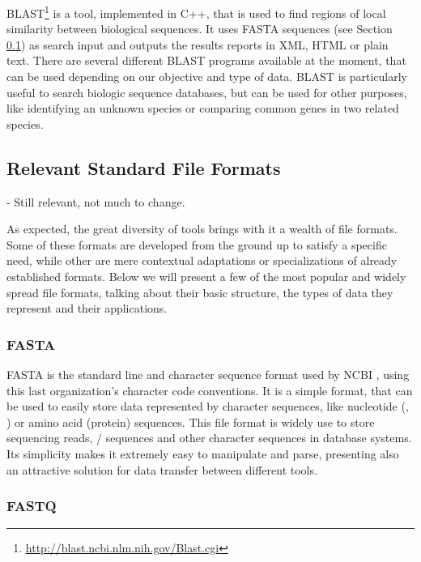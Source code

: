BLAST\footnote{\url{http://blast.ncbi.nlm.nih.gov/Blast.cgi}} is a tool,
implemented in C++, that is used to find regions of local similarity between
biological sequences. It uses FASTA sequences (see Section \ref{sec:formats}) as
search input and outputs the results reports in XML, HTML or plain text. There
are several different BLAST programs available at the moment, that can be used
depending on our objective and type of data. BLAST is particularly useful to
search biologic sequence databases, but can be used for other purposes, like
identifying an unknown species or comparing common genes in two related
species.

\subsection{Relevant Standard File Formats}\label{sec:formats}

\begin{Notes}
- Still relevant, not much to change.\\
\end{Notes}

As expected, the great diversity of \rnaseq{} tools brings with it a wealth of
file formats. Some of these formats are developed from the ground up to satisfy
a specific need, while other are mere contextual adaptations or specializations
of already established formats. Below we will present a few of the most popular
and widely spread file formats, talking about their basic structure, the types
of data they represent and their applications.

\subsubsection*{FASTA}

FASTA is the standard line and character sequence format used by NCBI
\cite{ncbi:fasta}, using this last organization's character code conventions. It
is a simple format, that can be used to easily store data represented by
character sequences, like nucleotide (\dna, \rna) or amino acid (protein)
sequences. This file format is widely use to store sequencing reads, \dna/\rna{}
sequences and other character sequences in database systems. Its simplicity
makes it extremely easy to manipulate and parse, presenting also an attractive
solution for data transfer between different tools.

\subsubsection*{FASTQ}

